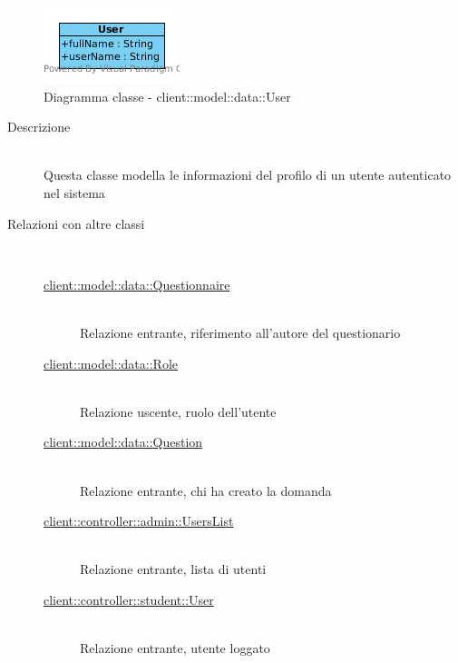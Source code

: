 \vspace{0.5cm}
\hypertarget{client::model::data::User}{}
\begin{center}
			\begin{figure}[H]
				\centering \includegraphics[scale=4, max width=\textwidth, max height=\myheight]{../img/diagrammiClassi/client/model/data/User.png}
				\caption{Diagramma classe - client::model::data::User}
			\end{figure}
		\end{center}\begin{description}
\item[Descrizione] \hfill \\
 Questa classe modella le informazioni del profilo di un utente autenticato nel sistema
\item[Relazioni con altre classi] \hfill \\
 \vspace{-7mm}
\begin{description}
\item[\hyperlink{client::model::data::Questionnaire}{client::model::data::Questionnaire}] \hfill \\
 Relazione entrante, riferimento all'autore del questionario
\item[\hyperlink{client::model::data::Role}{client::model::data::Role}] \hfill \\
 Relazione uscente, ruolo dell'utente
\item[\hyperlink{client::model::data::Question}{client::model::data::Question}] \hfill \\
 Relazione entrante, chi ha creato la domanda
\item[\hyperlink{client::controller::admin::UsersList}{client::controller::admin::UsersList}] \hfill \\
 Relazione entrante, lista di utenti
\item[\hyperlink{client::controller::student::User}{client::controller::student::User}] \hfill \\
 Relazione entrante, utente loggato
\end{description}


\end{description}
